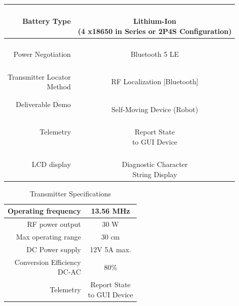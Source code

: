 \documentclass[12pt]{article}
\begin{document}
\begin{multicols}{2}
\begin{table}
\begin{tabular} {| r | c | }
\hline
Battery Type &   \parbox{0.45\linewidth}{\centering\hfill \\  Lithium-Ion \\ (4 x18650 in Series or 2P4S Configuration)}\\
\hline
\parbox{0.45\linewidth}{\raggedleft \hfill \\  Power Negotiation} &  \parbox{0.45\linewidth}{\centering\hfill \\ Bluetooth 5 LE\\}\\
\hline
\parbox{0.45\linewidth}{\raggedleft \hfill \\  Transmitter Locator \\ Method \\[0.4em]} &   \parbox{0.45\linewidth}{\centering \hfill \\  RF Localization  [Bluetooth]}\\
\hline
Deliverable Demo &   \parbox{0.45\linewidth}{\centering \hfill \\  Self-Moving Device (Robot)}\\
\hline
Telemetry &   \parbox{0.45\linewidth}{\centering \hfill \\  Report State \\to GUI Device}\\[0.4em]
\hline
LCD display &   \parbox{0.45\linewidth}{\centering \hfill \\  Diagnostic Character \\String Display}\\
\hline
\end{tabular}
\end{table}
 
\vfill
\columnbreak

\begin{table}
\centering
\caption{Transmitter Specifications}
\begin{tabular} {| r | c | }
\hline
Operating frequency & 13.56 MHz\\
\hline
RF power output & 30 W\\
\hline
Max operating range & 30 cm\\
\hline
DC Power supply  & 12V 5A max.  \\
\hline
\parbox{0.45\linewidth}{\raggedleft  Conversion Efficiency\\ DC-AC\\[0.4em]}  & 80\%\\
\hline
Telemetry &\parbox{0.48\linewidth}{\centering Report State \\to GUI Device\\[0.4em]}\\
\hline
\end{tabular}
\end{table}




\end{multicols}
\end{document}
